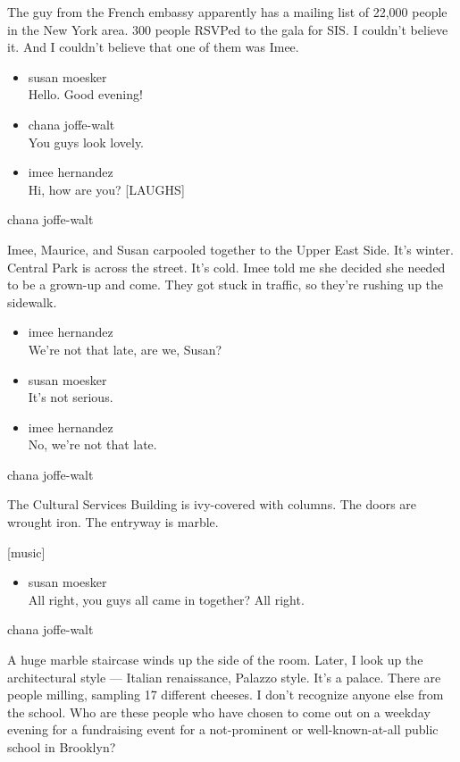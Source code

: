 The guy from the French embassy apparently has a mailing list of 22,000
people in the New York area. 300 people RSVPed to the gala for SIS. I
couldn't believe it. And I couldn't believe that one of them was Imee.

\begin{itemize}
\item
  susan moesker\\
  Hello. Good evening!
\item
  chana joffe-walt\\
  You guys look lovely.
\item
  imee hernandez\\
  Hi, how are you? {[}LAUGHS{]}
\end{itemize}

chana joffe-walt

Imee, Maurice, and Susan carpooled together to the Upper East Side. It's
winter. Central Park is across the street. It's cold. Imee told me she
decided she needed to be a grown-up and come. They got stuck in traffic,
so they're rushing up the sidewalk.

\begin{itemize}
\item
  imee hernandez\\
  We're not that late, are we, Susan?
\item
  susan moesker\\
  It's not serious.
\item
  imee hernandez\\
  No, we're not that late.
\end{itemize}

chana joffe-walt

The Cultural Services Building is ivy-covered with columns. The doors
are wrought iron. The entryway is marble.

{[}music{]}

\begin{itemize}
\tightlist
\item
  susan moesker\\
  All right, you guys all came in together? All right.
\end{itemize}

chana joffe-walt

A huge marble staircase winds up the side of the room. Later, I look up
the architectural style --- Italian renaissance, Palazzo style. It's a
palace. There are people milling, sampling 17 different cheeses. I don't
recognize anyone else from the school. Who are these people who have
chosen to come out on a weekday evening for a fundraising event for a
not-prominent or well-known-at-all public school in Brooklyn?

